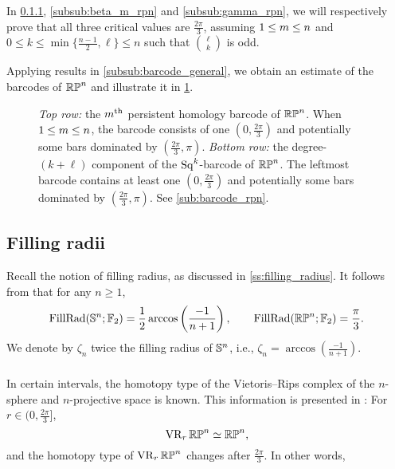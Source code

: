 In \cref{subsub:rpn homotopy type}, \cref{subsub:beta_m_rpn} and \cref{subsub:gamma_rpn}, we will respectively prove that all three critical values are $\frac{2\pi}{3}$, assuming $1 \leq m \leq n$ and $0 \leq k \leq \min\{\frac{n-1}{2}, \ell\} \leq n$ such that $\binom{\ell}{k}$ is odd.

Applying results in \cref{subsub:barcode_general}, we obtain an estimate of the barcodes of $\mathbb{RP}^n$ and illustrate it in \cref{fig:sq barcodes}.

\begin{figure}
	\centering
	
	\caption{\emph{Top row:} the $m^{\mathrm{th}}$ persistent homology barcode of $\mathbb{RP}^n$.
		When $1\leq m \leq n$, the barcode consists of one $(0,\frac{2\pi}{3})$ and potentially some bars dominated by $(\frac{2\pi}{3}, \pi)$.
		\emph{Bottom row:} the degree-$(k+\ell)$ component of the $\operatorname{Sq}^k$-barcode of $\mathbb{RP}^n$.
		The leftmost barcode contains at least one $(0,\frac{2\pi}{3})$ and potentially some bars dominated by $(\frac{2\pi}{3}, \pi)$.
		See \cref{sub:barcode_rpn}.
	}
	\label{fig:sq barcodes}
\end{figure}


\subsection{Filling radii}
\label{sub:filling radius of rpn}
Recall the notion of filling radius, as discussed in \cref{ss:filling_radius}.
It follows from \cite{katz1983filling} that for any $n \geq 1$,
\[
\operatorname{FillRad}(\mathbb{S}^n;{\mathbb{F}_2}) = \frac{1}{2}\arccos\left(\frac{-1}{n+1}\right), \qquad
\operatorname{FillRad}(\mathbb{RP}^n;{\mathbb{F}_2}) = \frac{\pi}{3}.
\]
We denote by $\zeta_n$ twice the filling radius of $\mathbb{S}^n$, i.e., $\zeta_n = \arccos(\frac{-1}{n+1})$.

\subsubsection{}
\label{subsub:rpn homotopy type}

In certain intervals, the homotopy type of the Vietoris--Rips complex of the $n$-sphere and $n$-projective space is known.
This information is presented in \cite[Thm.~4.5]{adams2022metric}:
For $r \in (0,\frac{2\pi}{3} ]$,
\[
\operatorname{VR}_r\mathbb{RP}^n \simeq \mathbb{RP}^n,
\]
and the homotopy type of $\operatorname{VR}_r\mathbb{RP}^n$ changes after $\tfrac{2\pi}{3}$.
In other words,

